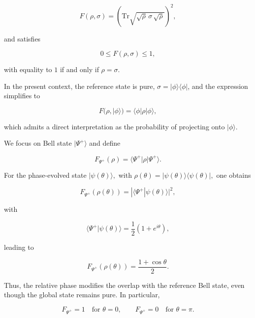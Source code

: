 \begin{equation}
F(\rho,\sigma)
=
\left(
\mathrm{Tr}
\sqrt{
\sqrt{\rho}\,
\sigma\,
\sqrt{\rho}
}
\right)^2,
\label{eq:fidelity_general_definition}
\end{equation}

and satisfies

\[
0
\le
F(\rho,\sigma)
\le
1,
\]

with equality to \(1\) if and only if \( \rho = \sigma \).

\medskip

In the present context, the reference state is pure, \( \sigma = |\phi\rangle\langle\phi| \), and the expression simplifies to

\begin{equation}
F(\rho,|\phi\rangle)
=
\langle \phi | \rho | \phi \rangle,
\label{eq:fidelity_pure_reference}
\end{equation}

which admits a direct interpretation as the probability of projecting onto \( |\phi\rangle \).

\medskip

We focus on Bell state 
\( 
|\Psi^+\rangle
\)
and define

\begin{equation}
F_{\Psi^+}(\rho)
=
\langle \Psi^+ | \rho | \Psi^+ \rangle.
\label{eq:fidelity_psi_plus_definition}
\end{equation}

\medskip

For the phase-evolved state
\(
|\psi(\theta)\rangle,
\)
with
\(
\rho(\theta)
=
|\psi(\theta)\rangle\langle\psi(\theta)|,
\)
one obtains

\[
F_{\Psi^+}(\rho(\theta))
=
|\langle \Psi^+|\psi(\theta)\rangle|^2,
\]

with

\[
\langle \Psi^+|\psi(\theta)\rangle
=
\frac{1}{2}
\left(
1+e^{i\theta}
\right),
\]

leading to

\begin{equation}
F_{\Psi^+}(\rho(\theta))
=
\frac{1+\cos\theta}{2}.
\label{eq:phase_state_fidelity_psi_plus}
\end{equation}

\medskip

Thus, the relative phase modifies the overlap with the reference Bell state, even though the global state remains pure. In particular,

\[
F_{\Psi^+}=1
\quad
\text{for }
\theta=0,
\qquad
F_{\Psi^+}=0
\quad
\text{for }
\theta=\pi.
\]

